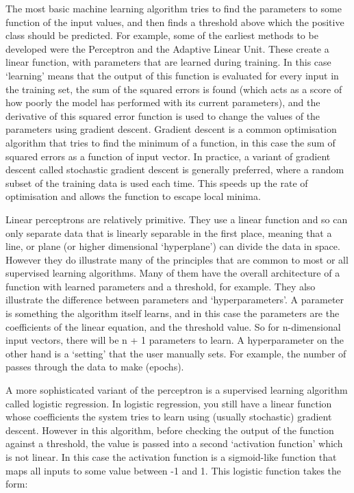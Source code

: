 The most basic machine learning algorithm tries to find the parameters to some function of the input values, and then finds a threshold above which the positive class should be predicted. For example, some of the earliest methods to be developed were the Perceptron and the Adaptive Linear Unit. These create a linear function, with parameters that are learned during training. In this case `learning' means that the output of this function is evaluated for every input in the training set, the sum of the squared errors is found (which acts as a score of how poorly the model has performed with its current parameters), and the derivative of this squared error function is used to change the values of the parameters using gradient descent. Gradient descent is a common optimisation algorithm that tries to find the minimum of a function, in this case the sum of squared errors as a function of input vector. In practice, a variant of gradient descent called stochastic gradient descent is generally preferred, where a random subset of the training data is used each time. This speeds up the rate of optimisation and allows the function to escape local minima.

Linear perceptrons are relatively primitive. They use a linear function and so can only separate data that is linearly separable in the first place, meaning that a line, or plane (or higher dimensional `hyperplane') can divide the data in space. However they do illustrate many of the principles that are common to most or all supervised learning algorithms. Many of them have the overall architecture of a function with learned parameters and a threshold, for example. They also illustrate the difference between parameters and `hyperparameters'. A parameter is something the algorithm itself learns, and in this case the parameters are the coefficients of the linear equation, and the threshold value. So for n-dimensional input vectors, there will be n + 1 parameters to learn. A hyperparameter on the other hand is a `setting' that the user manually sets. For example, the number of passes through the data to make (epochs).

A more sophisticated variant of the perceptron is a supervised learning algorithm called logistic regression. In logistic regression, you still have a linear function whose coefficients the system tries to learn using (usually stochastic) gradient descent. However in this algorithm, before checking the output of the function against a threshold, the value is passed into a second `activation function' which is not linear. In this case the activation function is a sigmoid-like function that maps all inputs to some value between -1 and 1. This logistic function takes the form:

